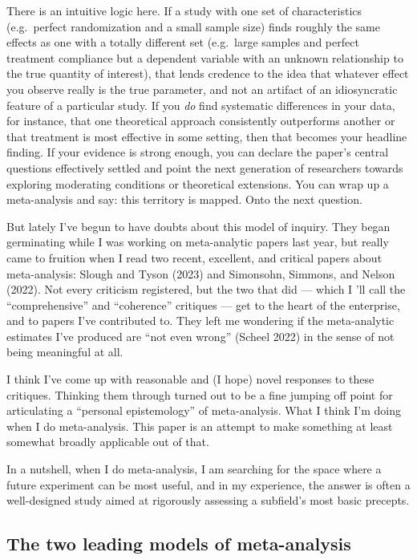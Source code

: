 \documentclass{article}
\begin{document}
There is an intuitive logic here. If a study with one set of
characteristics (e.g.~perfect randomization and a small sample size)
finds roughly the same effects as one with a totally different set
(e.g.~large samples and perfect treatment compliance but a dependent
variable with an unknown relationship to the true quantity of interest),
that lends credence to the idea that whatever effect you observe really
is the true parameter, and not an artifact of an idiosyncratic feature
of a particular study. If you \emph{do} find systematic differences in
your data, for instance, that one theoretical approach consistently
outperforms another or that treatment is most effective in some setting,
then that becomes your headline finding. If your evidence is strong
enough, you can declare the paper's central questions effectively
settled and point the next generation of researchers towards exploring
moderating conditions or theoretical extensions. You can wrap up a
meta-analysis and say: this territory is mapped. Onto the next question.

But lately I've begun to have doubts about this model of inquiry. They
began germinating while I was working on meta-analytic papers last year,
but really came to fruition when I read two recent, excellent, and
critical papers about meta-analysis: Slough and Tyson (2023) and
Simonsohn, Simmons, and Nelson (2022). Not every criticism registered,
but the two that did --- which I 'll call the ``comprehensive'' and
``coherence'' critiques --- get to the heart of the enterprise, and to
papers I've contributed to. They left me wondering if the meta-analytic
estimates I've produced are ``not even wrong'' (Scheel 2022) in the
sense of not being meaningful at all.

I think I've come up with reasonable and (I hope) novel responses to
these critiques. Thinking them through turned out to be a fine jumping
off point for articulating a ``personal epistemology'' of meta-analysis.
What I think I'm doing when I do meta-analysis. This paper is an attempt
to make something at least somewhat broadly applicable out of that.

In a nutshell, when I do meta-analysis, I am searching for the space
where a future experiment can be most useful, and in my experience, the
answer is often a well-designed study aimed at rigorously assessing a
subfield's most basic precepts.

\subsection{The two leading models of
meta-analysis}\label{the-two-leading-models-of-meta-analysis}
\end{document}
